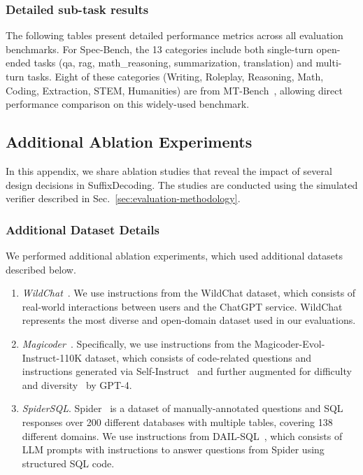 \subsubsection{Detailed sub-task results}

The following tables present detailed performance metrics across all evaluation benchmarks. For Spec-Bench, the 13 categories include both single-turn open-ended tasks (qa, rag, math\_reasoning, summarization, translation) and multi-turn tasks. Eight of these categories (Writing, Roleplay, Reasoning, Math, Coding, Extraction, STEM, Humanities) are from MT-Bench~\citep{mtbench}, allowing direct performance comparison on this widely-used benchmark.






\subsection{Additional Ablation Experiments}
\label{sec:additional-ablation-experiments}

In this appendix, we share ablation studies that reveal the impact of several design decisions in SuffixDecoding. The studies are conducted using the simulated verifier described in Sec.~\ref{sec:evaluation-methodology}.

\subsubsection{Additional Dataset Details}
\label{sec:dataset-details}

We performed additional ablation experiments, which used additional datasets described below.

\begin{enumerate}
\item \emph{WildChat}~\citep{zhao2024wildchat}. We use instructions from the WildChat dataset, which consists of real-world interactions between users and the ChatGPT service. WildChat represents the most diverse and open-domain dataset used in our evaluations.
\item \emph{Magicoder}~\citep{wei2023magicoder}. Specifically, we use instructions from the Magicoder-Evol-Instruct-110K dataset, which consists of code-related questions and instructions generated via Self-Instruct~\citep{codealpaca,wang-etal-2023-self-instruct} and further augmented for difficulty and diversity~\citep{luo2023wizardcoder} by GPT-4. 
\item \emph{SpiderSQL}. Spider~\citep{yu-etal-2018-spider} is a dataset of manually-annotated questions and SQL responses over 200 different databases with multiple tables, covering 138 different domains. We use instructions from DAIL-SQL~\citep{10.14778/3641204.3641221}, which consists of LLM prompts with instructions to answer questions from Spider using structured SQL code.
\end{enumerate}

